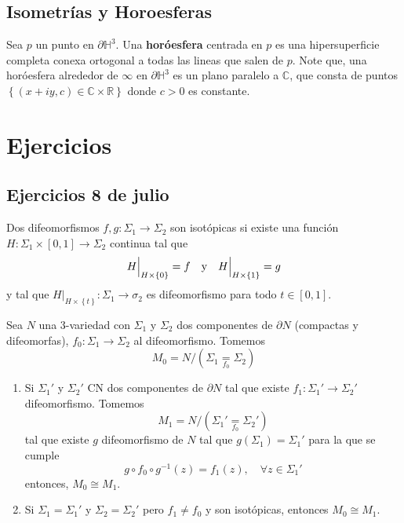 \documentclass[12pt]{report}
\theoremstyle{largebreak}
\newcommand\cf[3]{\ensuremath{#1:#2\rightarrow#3}}
\begin{document}
    \section{Isometrías y Horoesferas}

    Sea $p$ un punto en $\partial\mathbb{H}^3$. Una \textbf{horóesfera} centrada en $p$ es una hipersuperficie completa conexa ortogonal a todas las lineas que salen de $p$. Note que, una horóesfera alrededor de $\infty$ en $\partial\mathbb{H}^3$ es un plano paralelo a $\mathbb{C}$, que consta de puntos $\left\{(x+iy,c)\in\mathbb{C}\times\mathbb{R} \right\}$ donde $c>0$ es constante.

    \chapter{Ejercicios}

    \section{Ejercicios 8 de julio}

    \begin{mydef}
        Dos difeomorfismos $\cf{f,g}{\Sigma_1}{\Sigma_2}$ son isotópicas si existe una función $\cf{H}{\Sigma_1\times[0,1]}{\Sigma_2}$ continua tal que
        \begin{equation*}
            H\Big|_{ H\times\left\{0\right\}}=f\quad\textup{y}\quad H\Big|_{ H\times\left\{1\right\}}=g
        \end{equation*}
        y tal que $\cf{H\Big|_{ H\times\left\{t\right\}}}{\Sigma_1}{\sigma_2}$ es difeomorfismo para todo $t\in[0,1]$.
    \end{mydef}

    \begin{excer}
        Sea $N$ una $3$-variedad con $\Sigma_1$ y $\Sigma_2$ dos componentes de $\partial N$ (compactas y difeomorfas), $\cf{f_0}{\Sigma_1}{\Sigma_2}$ al difeomorfismo. Tomemos
        \begin{equation*}
            M_0=N/\left(\Sigma_1\underset{ f_0}{=}\Sigma_2\right)
        \end{equation*}
        \begin{enumerate}
            \item Si $\Sigma_1'$ y $\Sigma_2'$ CN dos componentes de $\partial N$ tal que existe $\cf{f_1}{\Sigma_1'}{\Sigma_2'}$ difeomorfismo. Tomemos
            \begin{equation*}
                M_1=N/\left(\Sigma_1'\underset{ f_0}{=}\Sigma_2'\right)
            \end{equation*}
            tal que existe $g$ difeomorfismo de $N$ tal que $g(\Sigma_1)=\Sigma_1'$ para la que se cumple
            \begin{equation*}
                g\circ f_0\circ g^{ -1}(z)=f_1(z),\quad\forall z\in\Sigma_1'
            \end{equation*}
            entonces, $M_0\cong M_1$.
            \item Si $\Sigma_1=\Sigma_1'$ y $\Sigma_2=\Sigma_2'$ pero $f_1\neq f_0$ y son isotópicas, entonces $M_0\cong M_1$.
        \end{enumerate}
    \end{excer}
\end{document}
